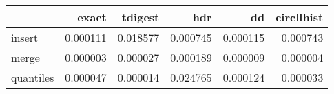 \begin{tabular}{lrrrrr}
\toprule
{} &     exact &   tdigest &       hdr &        dd &  circllhist \\
\midrule
insert    &  0.000111 &  0.018577 &  0.000745 &  0.000115 &    0.000743 \\
merge     &  0.000003 &  0.000027 &  0.000189 &  0.000009 &    0.000004 \\
quantiles &  0.000047 &  0.000014 &  0.024765 &  0.000124 &    0.000033 \\
\bottomrule
\end{tabular}
